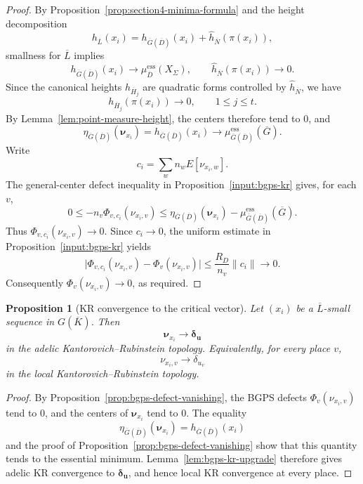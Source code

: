 \documentclass[10pt,a4paper]{amsart}
\theoremstyle{plain}
\newtheorem{proposition}[theorem]{Proposition}
\theoremstyle{plain}
\numberwithin{equation}{section}
\providecommand{\bD}{\overline{D}}
\providecommand{\bL}{\overline{L}}
\providecommand{\bN}{\overline{N}}
\providecommand{\muess}{\mu^{\mathrm{ess}}}
\begin{document}
\begin{proof}
	By Proposition~\ref{prop:section4-minima-formula} and the height decomposition
	\[
	h_{\bL}(x_i)
	=h_{\overline G(\bD)}(x_i)+\hat h_{\bN}(\pi(x_i)),
	\]
	smallness for \(\bL\) implies
	\[
	h_{\overline G(\bD)}(x_i)\to\muess_{\bD}(X_\Sigma),
	\qquad
	\hat h_{\bN}(\pi(x_i))\to0.
	\]
	Since the canonical heights \(h_{\overline H_j}\) are quadratic forms controlled
	by \(\hat h_{\bN}\), we have
	\[
	h_{\overline H_j}(\pi(x_i))\to0,\qquad 1\le j\le t.
	\]
	By Lemma~\ref{lem:point-measure-height}, the centers therefore tend to \(0\),
	and
	\[
	\eta_{\overline G(\bD)}(\boldsymbol\nu_{x_i})
	=h_{\overline G(\bD)}(x_i)
	\to\muess_{\overline G(\bD)}(\overline G).
	\]
	Write
	\[
	c_i=\sum_w n_wE[\nu_{x_i,w}].
	\]
	The general-center defect inequality in Proposition~\ref{input:bgps-kr} gives,
	for each \(v\),
	\[
	0\le -n_v\Phi_{v,c_i}(\nu_{x_i,v})
	\le
	\eta_{\overline G(\bD)}(\boldsymbol\nu_{x_i})
	-\muess_{\overline G(\bD)}(\overline G).
	\]
	Thus \(\Phi_{v,c_i}(\nu_{x_i,v})\to0\).  Since \(c_i\to0\), the uniform
	estimate in Proposition~\ref{input:bgps-kr} yields
	\[
	\bigl|\Phi_{v,c_i}(\nu_{x_i,v})-\Phi_v(\nu_{x_i,v})\bigr|
	\le \frac{R_D}{n_v}\|c_i\|\longrightarrow0.
	\]
	Consequently \(\Phi_v(\nu_{x_i,v})\to0\), as required.
\end{proof}

\begin{proposition}[KR convergence to the critical vector]
	\label{prop:monocritical-kr}
	Let \((x_i)\) be a \(\bL\)-small sequence in \(G(\overline K)\).  Then
	\[
	\boldsymbol\nu_{x_i}\longrightarrow\boldsymbol\delta_{\mathbf u}
	\]
	in the adelic Kantorovich--Rubinstein topology.  Equivalently, for every place
	\(v\),
	\[
	\nu_{x_i,v}\longrightarrow\delta_{u_v}
	\]
	in the local Kantorovich--Rubinstein topology.
\end{proposition}

\begin{proof}
	By Proposition~\ref{prop:bgps-defect-vanishing}, the BGPS defects
	\(\Phi_v(\nu_{x_i,v})\) tend to \(0\), and the centers of
	\(\boldsymbol\nu_{x_i}\) tend to \(0\).  The equality
	\[
	\eta_{\overline G(\bD)}(\boldsymbol\nu_{x_i})
	=h_{\overline G(\bD)}(x_i)
	\]
	and the proof of Proposition~\ref{prop:bgps-defect-vanishing} show that this
	quantity tends to the essential minimum.  Lemma~\ref{lem:bgps-kr-upgrade}
	therefore gives adelic KR convergence to
	\(\boldsymbol\delta_{\mathbf u}\), and hence local KR convergence at every
	place.
\end{proof}
\end{document}
